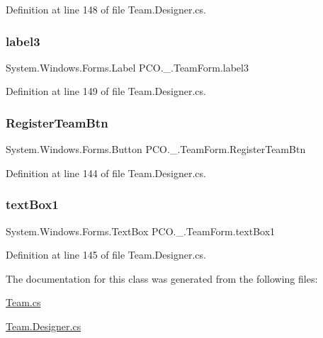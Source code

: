 Definition at line 148 of file Team.\+Designer.\+cs.

\mbox{\label{classPCO_1_1__0_1_1TeamForm_a7172b2a0037432d76865266b1c33eca9}} 
\subsubsection{\texorpdfstring{label3}{label3}}
{\footnotesize\ttfamily System.\+Windows.\+Forms.\+Label P\+C\+O.\+\_.\+Team\+Form.\+label3\hspace{0.3cm}{\ttfamily [private]}}



Definition at line 149 of file Team.\+Designer.\+cs.

\mbox{\label{classPCO_1_1__0_1_1TeamForm_a77ddf05e8808fb4acf9c781dd7ac1758}} 
\subsubsection{\texorpdfstring{Register\+Team\+Btn}{RegisterTeamBtn}}
{\footnotesize\ttfamily System.\+Windows.\+Forms.\+Button P\+C\+O.\+\_.\+Team\+Form.\+Register\+Team\+Btn\hspace{0.3cm}{\ttfamily [private]}}



Definition at line 144 of file Team.\+Designer.\+cs.

\mbox{\label{classPCO_1_1__0_1_1TeamForm_a6c0b69087c958e097e8383236d2470e2}} 
\subsubsection{\texorpdfstring{text\+Box1}{textBox1}}
{\footnotesize\ttfamily System.\+Windows.\+Forms.\+Text\+Box P\+C\+O.\+\_.\+Team\+Form.\+text\+Box1\hspace{0.3cm}{\ttfamily [private]}}



Definition at line 145 of file Team.\+Designer.\+cs.



The documentation for this class was generated from the following files\+:\begin{DoxyCompactItemize}
\item 
\hyperlink{Team_8cs}{Team.\+cs}\item 
\hyperlink{Team_8Designer_8cs}{Team.\+Designer.\+cs}\end{DoxyCompactItemize}
